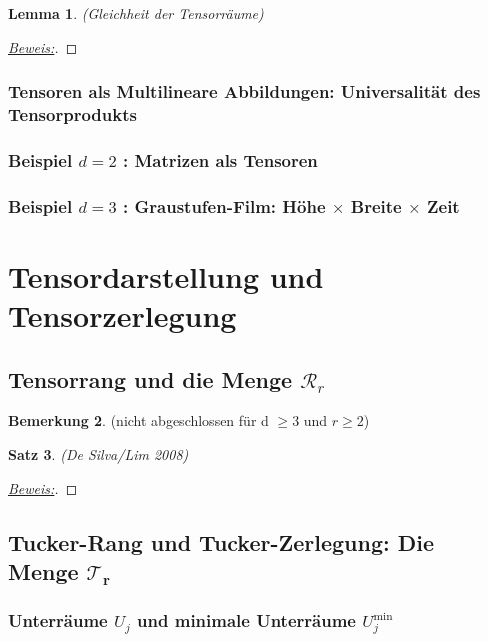 \documentclass[11pt]{article} %
\newtheorem{thm}{Satz}[section]
\newtheorem{lemma}[thm]{Lemma}
\theoremstyle{definition}
\newtheorem{rmk}[thm]{Bemerkung}
\begin{document}
\begin{lemma} (Gleichheit der Tensorräume)
\end{lemma}
\begin{proof}[\underline{Beweis:}\nopunct]

\end{proof}

\subsubsection{Tensoren als Multilineare Abbildungen: Universalität des Tensorprodukts}

\subsubsection{Beispiel $d=2$ : Matrizen als Tensoren}

\subsubsection{Beispiel $d=3$ : Graustufen-Film: Höhe $\times$ Breite $\times$ Zeit }

\section{Tensordarstellung und Tensorzerlegung}

\subsection{Tensorrang und die Menge $\mathcal{R}_{r}$}

\begin{rmk} (nicht abgeschlossen für d $\geq 3$ und $r \geq 2$)
\end{rmk}

\begin{thm} (De Silva/Lim 2008)
\end{thm}
\begin{proof}[\underline{Beweis:}\nopunct]
\end{proof}


\subsection{Tucker-Rang und Tucker-Zerlegung: Die Menge $\mathcal{T}_{\mathbf{r}}$}

\subsubsection{Unterräume $U_{j}$ und minimale Unterräume $U_{j}^{\min}$}
\end{document}
